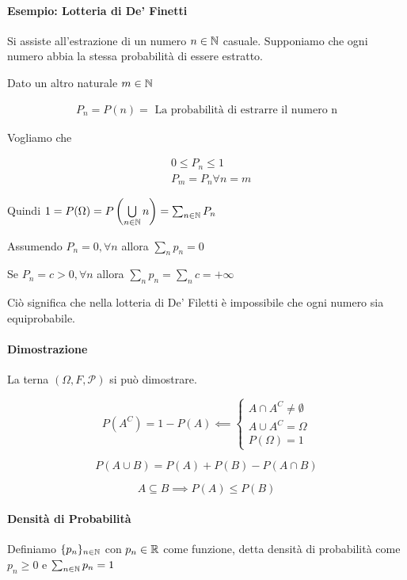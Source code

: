 \paragraph{Esempio: Lotteria di De' Finetti}
Si assiste all'estrazione di un numero $ n \in \mathbb{N} $ casuale. Supponiamo che ogni numero abbia la stessa probabilità di essere estratto.

Dato un altro naturale $ m \in \mathbb{N} $

\begin{align*}
P_n = P(n) = \text{ La probabilità di estrarre il numero n}
\end{align*}

Vogliamo che 

\begin{align*}
& 0 \leq P_n \leq 1 \\
& P_m = P_n \forall n = m
\end{align*}

Quindi $ 1 = P(\Omega) = P \left( \bigcup\limits_{n \in \mathbb{N}} n \right) = \sum_{n \in \mathbb{N}} P_n $

Assumendo $ P_n = 0, \forall n $ allora $ \sum_{n} p_n = 0 $

Se $ P_n = c > 0, \forall n $ allora $ \sum_{n} p_n = \sum_{n} c = + \infty $

Ciò significa che nella lotteria di De' Filetti è impossibile che ogni numero sia equiprobabile.

\paragraph{Dimostrazione}

La terna $ (\Omega, F, \mathcal{P}) $ si può dimostrare.

\[ P(A^C) = 1 - P(A) \impliedby \begin{cases}
A \cap A^C \neq \emptyset \\
A \cup A^C = \Omega \\
P(\Omega) = 1
\end{cases} \]

\[ P(A \cup B) = P(A) + P(B) - P(A \cap B)\]

\[ A \subseteq B \implies P(A) \leq P(B) \]

\paragraph{Densità di Probabilità }

Definiamo $ \{p_n\}_{n \in \mathbb{N}} $ con $ p_n \in \mathbb{R} $ come funzione, detta densità di probabilità come $ p_n \geq 0 $ e $ \sum_{n \in \mathbb{N}} p_n = 1 $ 

